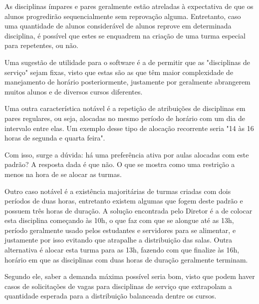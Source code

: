 
        As disciplinas ímpares e pares geralmente estão atreladas à expectativa de que os alunos progredirão sequencialmente sem reprovação alguma. Entretanto, caso uma quantidade de alunos considerável de alunos reprove em determinada disciplina, é possível que estes se enquadrem na criação de uma turma especial para repetentes, ou não.

        Uma sugestão de utilidade para o software é a de permitir que as "disciplinas de serviço" sejam fixas, visto que estas são as que têm maior complexidade de manejamento de horário posteriormente, justamente por geralmente abrangerem muitos alunos e de diversos cursos diferentes.

        Uma outra característica notável é a repetição de atribuições de disciplinas em pares regulares, ou seja, alocadas no mesmo período de horário com um dia de intervalo entre elas. Um exemplo desse tipo de alocação recorrente seria "14 às 16 horas de segunda e quarta feira".

        Com isso, surge a dúvida: há uma preferência ativa por aulas alocadas com este padrão? A resposta dada é que não. O que se mostra como uma restrição a menos na hora de se alocar as turmas.

        Outro caso notável é a existência majoritárias de turmas criadas com dois períodos de duas horas, entretanto existem algumas que fogem deste padrão e possuem três horas de duração. A solução encontrada pelo Diretor é a de colocar esta disciplina começando às 10h, o que faz com que se alongue até as 13h, período geralmente usado pelos estudantes e servidores para se alimentar, e justamente por isso evitando que atrapalhe a distribuição das salas. Outra alternativa é alocar esta turma para as 13h, fazendo com que finalize às 16h, horário em que as disciplinas com duas horas de duração geralmente terminam.

        Segundo ele, saber a demanda máxima possível seria bom, visto que podem haver casos de solicitações de vagas para disciplinas de serviço que extrapolam a quantidade esperada para a distribuição balanceada dentre os cursos.

